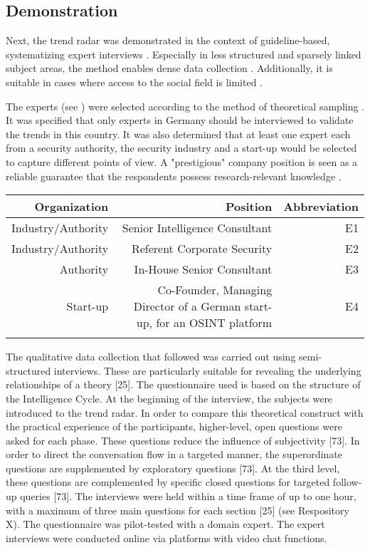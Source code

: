 \documentclass[10pt]{article}
\begin{document}
\subsection{Demonstration}

Next, the trend radar was demonstrated in the context of guideline-based,
systematizing expert interviews \cite{Bogner.2014, Glaser.2009, Meuser.1991}.
Especially in less structured and sparsely linked subject areas, the method
enables dense data collection \cite{Bogner.2014,Meuser.1991}. Additionally,
it is suitable in cases where access to the social field is limited \cite{Bogner.2002c, Glaser.2009}.

The experts (see ) were selected according to the method of
theoretical sampling \cite{Glaser.1967,Eisenhardt.1989}. It was specified that only experts in
Germany should be interviewed to validate the trends in this
country. It was also determined that at least one expert each
from a security authority, the security industry and a
start-up would be selected to capture different points of
view. A "prestigious" company position is seen as a reliable
guarantee that the respondents possess research-relevant knowledge \cite{Bogner.2002b}.

\begin{tabular}[h]{r|r|r}
    \caption{Interviewed experts} \\
    \resizebox{\columnwidth}{!}
    Organization & Position & Abbreviation \\
    \hline
    Industry/Authority & Senior Intelligence Consultant & E1 \\
    \hline
    Industry/Authority & Referent Corporate Security & E2 \\
    \hline
    Authority & In-House Senior Consultant & E3 \\
    \hline
    Start-up  & Co-Founder, Managing Director of a German start-up, for an OSINT platform & E4 \\
    \label{tab: experts}
\end{tabular}

The qualitative data collection that followed was carried out using
semi-structured interviews. These are particularly suitable for
revealing the underlying relationships of a theory [25]. The
questionnaire used is based on the structure of the Intelligence Cycle.
At the beginning of the interview, the subjects were introduced to the
trend radar. In order to compare this theoretical construct with the
practical experience of the participants, higher-level, open questions
were asked for each phase. These questions reduce the influence of
subjectivity [73]. In order to direct the conversation flow in a
targeted manner, the superordinate questions are supplemented by
exploratory questions [73]. At the third level, these questions are
complemented by specific closed questions for targeted follow-up
queries [73]. The interviews were held within a time frame of up to
one hour, with a maximum of three main questions for each section
 [25] (see Respository X). The questionnaire was pilot-tested with a
domain expert. The expert interviews were conducted online via
platforms with video chat functions.
\end{document}
